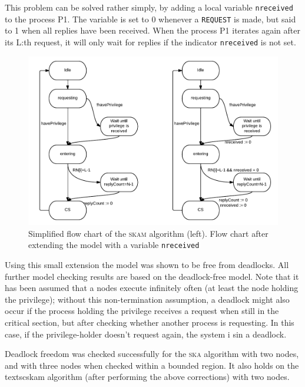 \documentclass[a4paper,10pt]{llncs}
\begin{document}
This problem can be solved rather simply, by adding a local variable \texttt{nreceived} to the process P1. The variable is set to 0 whenever a \texttt{REQUEST} is made, but said to 1 when all replies have been received. When the process P1 iterates again after its L:th request, it will only wait for replies if the indicator \texttt{nreceived} is not set.

\begin{figure}[]
\begin{center}
\includegraphics[width=\textwidth]{diagramboth.pdf}
 \caption
   {Simplified flow chart of the \textsc{skam} algorithm (left). Flow chart after extending the model with a variable \texttt{nreceived}}
\end{center}
\end{figure}

Using this small extension the model was shown to be free from deadlocks. All further model checking results are based on the deadlock-free model. Note that it has been assumed that a nodes execute infinitely often (at least the node holding the privilege); without this non-termination assumption, a deadlock might also occur if the process holding the privilege receives a request when still in the critical section, but after checking whether another process is requesting. In this case, if the privilege-holder doesn't request again, the system i sin a deadlock\cite{OgataSAL}\cite{OgataMaude}.

Deadlock freedom was checked successfully for the \textsc{ska} algorithm with two nodes, and with three nodes when checked within a bounded region. It also holds on the textsc{skam} algorithm (after performing the above corrections) with two nodes.
\end{document}
